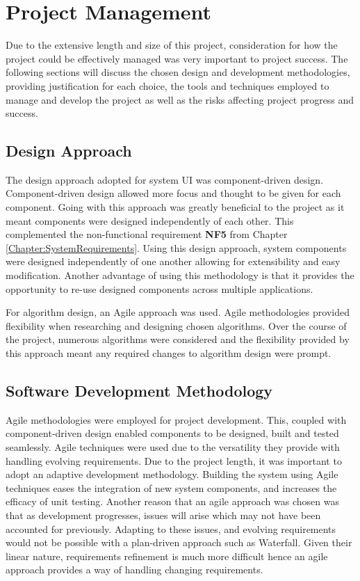 \chapter{Project Management}
\label{Chapter:ProjectManagement}
Due to the extensive length and size of this project, consideration for how the project could be effectively managed was very important to project success. The following sections will discuss the chosen design and development methodologies, providing justification for each choice, the tools and techniques employed to manage and develop the project as well as the risks affecting project progress and success.

\section{Design Approach}
The design approach adopted for system UI was component-driven design. Component-driven design allowed more focus and thought to be given for each component. Going with this approach was greatly beneficial to the project as it meant components were designed independently of each other. This complemented the non-functional requirement \textbf{NF5} from Chapter \ref{Chapter:SystemRequirements}. Using this design approach, system components were designed independently of one another allowing for extensibility and easy modification. Another advantage of using this methodology is that it provides the opportunity to re-use designed components across multiple applications. 

For algorithm design, an Agile approach was used. Agile methodologies provided flexibility when researching and designing chosen algorithms. Over the course of the project, numerous algorithms were considered and the flexibility provided by this approach meant any required changes to algorithm design were prompt.

\section{Software Development Methodology}
Agile methodologies were employed for project development. This, coupled with component-driven design enabled components to be designed, built and tested seamlessly. Agile techniques were used due to the versatility they provide with handling evolving requirements. Due to the project length, it was important to adopt an adaptive development methodology. Building the system using Agile techniques eases the integration of new system components, and increases the efficacy of unit testing. Another reason that an agile approach was chosen was that as development progresses, issues will arise which may not have been accounted for previously. Adapting to these issues, and evolving requirements would not be possible with a plan-driven approach such as Waterfall. Given their linear nature, requirements refinement is much more difficult hence an agile approach provides a way of handling changing requirements. 

